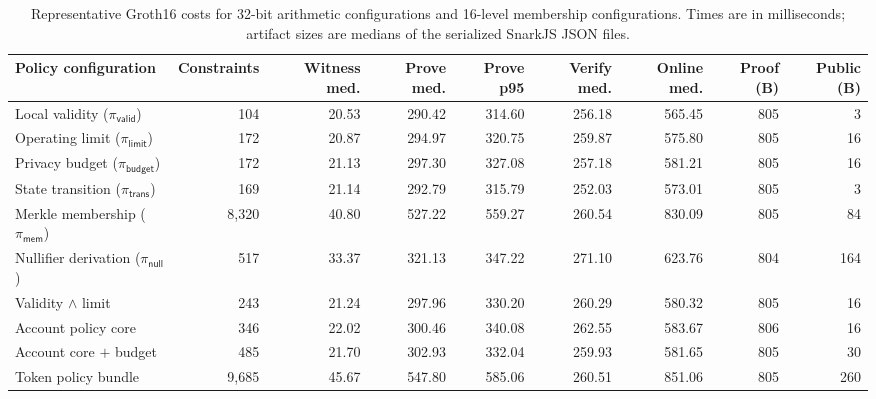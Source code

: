 \begin{table}[t]
\centering
\scriptsize
\setlength{\tabcolsep}{3.0pt}
\renewcommand{\arraystretch}{1.05}
\caption{Representative Groth16 costs for 32-bit arithmetic configurations and
16-level membership configurations. Times are in milliseconds; artifact sizes
are medians of the serialized SnarkJS JSON files.}
\label{tab:representative-costs}
\begin{tabular}{@{}lrrrrrrrr@{}}
\toprule
\textbf{Policy configuration} &
\textbf{Constraints} &
\textbf{Witness med.} &
\textbf{Prove med.} &
\textbf{Prove p95} &
\textbf{Verify med.} &
\textbf{Online med.} &
\textbf{Proof (B)} &
\textbf{Public (B)} \\
\midrule
Local validity ($\pi_{\mathsf{valid}}$) & 104 & 20.53 & 290.42 & 314.60 & 256.18 & 565.45 & 805 & 3 \\
Operating limit ($\pi_{\mathsf{limit}}$) & 172 & 20.87 & 294.97 & 320.75 & 259.87 & 575.80 & 805 & 16 \\
Privacy budget ($\pi_{\mathsf{budget}}$) & 172 & 21.13 & 297.30 & 327.08 & 257.18 & 581.21 & 805 & 16 \\
State transition ($\pi_{\mathsf{trans}}$) & 169 & 21.14 & 292.79 & 315.79 & 252.03 & 573.01 & 805 & 3 \\
Merkle membership ($\pi_{\mathsf{mem}}$) & 8,320 & 40.80 & 527.22 & 559.27 & 260.54 & 830.09 & 805 & 84 \\
Nullifier derivation ($\pi_{\mathsf{null}}$) & 517 & 33.37 & 321.13 & 347.22 & 271.10 & 623.76 & 804 & 164 \\
Validity $\wedge$ limit & 243 & 21.24 & 297.96 & 330.20 & 260.29 & 580.32 & 805 & 16 \\
Account policy core & 346 & 22.02 & 300.46 & 340.08 & 262.55 & 583.67 & 806 & 16 \\
Account core $+$ budget & 485 & 21.70 & 302.93 & 332.04 & 259.93 & 581.65 & 805 & 30 \\
Token policy bundle & 9,685 & 45.67 & 547.80 & 585.06 & 260.51 & 851.06 & 805 & 260 \\
\bottomrule
\end{tabular}
\end{table}
